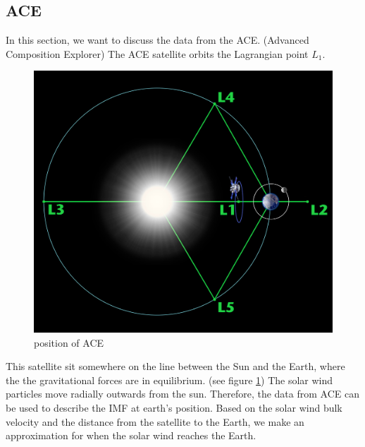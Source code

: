 \documentclass[10pt,a4paper]{article}
\begin{document}
\subsection{ACE \label{0_CHAPTER_ACE}}
In this section, we want to discuss the data from the ACE. (Advanced Composition Explorer)
The ACE satellite orbits the Lagrangian point $L_1$.
\begin{figure}[h]
\centering
\includegraphics[scale=0.06]{ACEposition.jpg}
\caption{position of ACE \cite{Link2} }
\label{position of ACE}
\end{figure}

This satellite sit somewhere on the line between the Sun and the Earth, where the the gravitational forces are in equilibrium. (see figure \ref{position of ACE}) 
The solar wind particles move radially outwards from the sun. Therefore, the data from ACE can be used to describe the IMF at earth's position. Based on the solar wind bulk
velocity and the distance from the satellite to the Earth, we make an approximation for when the solar wind reaches the Earth.
\end{document}
